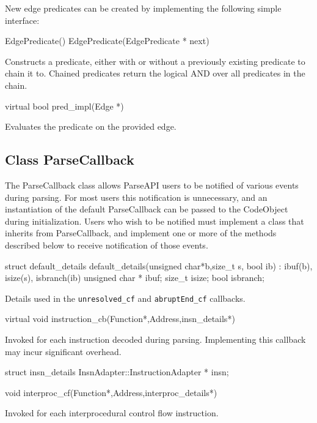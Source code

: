 \documentclass{article}
\newenvironment{apient}{\small\verbatim}{\endverbatim}
\newcommand{\apidesc}[1]{%
{\addtolength{\leftskip}{4em}%
#1\par\medskip}
}
\begin{document}
New edge predicates can be created by implementing the following simple interface:

\begin{apient}
EdgePredicate()
EdgePredicate(EdgePredicate * next)
\end{apient}
\apidesc{Constructs a predicate, either with or without a previously existing predicate to chain it to. Chained predicates return the logical AND over all predicates in the chain.}

\begin{apient}
virtual bool pred_impl(Edge *)
\end{apient}
\apidesc{Evaluates the predicate on the provided edge.}

\subsection{Class ParseCallback}

The ParseCallback class allows ParseAPI users to be notified of various events
during parsing. For most users this notification is unnecessary, and an
instantiation of the default ParseCallback can be passed to the CodeObject during initialization. Users who wish to be notified must implement a class that inherits from ParseCallback, and implement one or more of the methods described below to receive notification of those events.

\begin{apient}
struct default_details {
    default_details(unsigned char*b,size_t s, bool ib) : ibuf(b), isize(s), isbranch(ib) { }
    unsigned char * ibuf;
    size_t isize;
    bool isbranch;
}
\end{apient}
\apidesc{Details used in the \texttt{unresolved\_cf} and \texttt{abruptEnd\_cf}
callbacks.}

\begin{apient}
virtual void instruction_cb(Function*,Address,insn_details*)
\end{apient}
\apidesc{Invoked for each instruction decoded during parsing. Implementing this callback may incur significant overhead.}

\begin{apient}
struct insn_details {
    InsnAdapter::InstructionAdapter * insn;
}
\end{apient}

\begin{apient}
void interproc_cf(Function*,Address,interproc_details*)
\end{apient}
\apidesc{Invoked for each interprocedural control flow instruction.}
\end{document}
